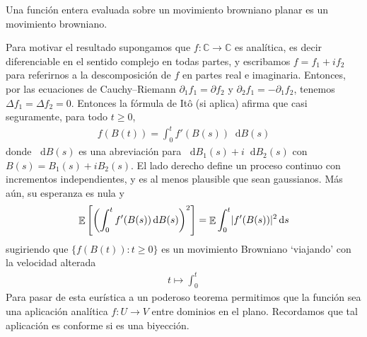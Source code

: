 \documentclass{article}
\newcommand{\ito}{Itô}
\newcommand{\dd}{\mathop{}\!\mathrm{d}}
\newcommand{\complexNumbers}{\mathbb{C}}
\DeclareMathOperator{\Expectation}{\mathbb{E}}
\DeclarePairedDelimiter{\abs}{\lvert}{\rvert}
\theoremstyle{plain}
\theoremstyle{remark}
\begin{document}
Una función entera evaluada sobre un movimiento browniano planar es un movimiento browniano.


Para motivar el resultado supongamos que \(f : \complexNumbers \rightarrow \complexNumbers\) es analítica, es decir diferenciable en el sentido complejo en todas partes, y escribamos \(f = f_1 + i f_2\) para referirnos a la descomposición de \(f\) en partes real e imaginaria.
Entonces, por las ecuaciones de Cauchy--Riemann \(\partial_1 f_1 = \partial f_2\) y \(\partial_2 f_1 = - \partial_1 f_2\), tenemos \(\Delta f_1 = \Delta f_2 = 0\).
Entonces la fórmula de \ito{} (si aplica) afirma que casi seguramente, para todo \(t \geq 0\),
\begin{align}
  f(B(t))
  =
  \int_0^t f'(B(s)) \dd B(s)
\end{align}
donde \(\dd B(s)\) es una abreviación para \(\dd B_1(s) + i \dd B_2(s)\) con \(B(s) = B_1(s) + i B_2(s)\).
El lado derecho define un proceso continuo con incrementos independientes, y es al menos plausible que sean gaussianos.
Más aún, su esperanza es nula y
\begin{align}
  \Expectation \left[ \left( \int_0^t f'(B(s)) \dd B(s) \right)^2 \right]
  =
  \Expectation \int_0^t \abs{f'(B(s))}^2 \dd s
\end{align}
sugiriendo que \(\{f(B(t)) : t \geq 0\}\) es un movimiento Browniano `viajando' con la velocidad alterada
\begin{align}
  t
  \mapsto
  \int_0^t
\end{align}
Para pasar de esta eurística a un poderoso teorema permitimos que la función sea una aplicación analítica \(f : U \rightarrow V\) entre dominios en el plano.
Recordamos que tal aplicación es conforme si es una biyección.
\end{document}
